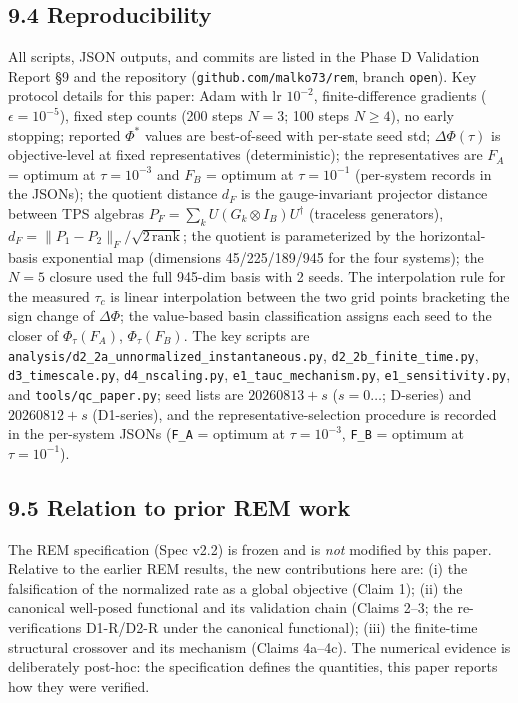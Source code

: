 \documentclass[
]{article}
\begin{document}
\subsection{9.4 Reproducibility}\label{reproducibility}

All scripts, JSON outputs, and commits are listed in the Phase D
Validation Report §9 and the repository
(\texttt{github.com/malko73/rem}, branch \texttt{open}). Key protocol
details for this paper: Adam with lr \(10^{-2}\), finite-difference
gradients (\(\epsilon = 10^{-5}\)), fixed step counts (200 steps
\(N=3\); 100 steps \(N \ge 4\)), no early stopping; reported \(\Phi^*\)
values are best-of-seed with per-state seed std; \(\Delta\Phi(\tau)\) is
objective-level at fixed representatives (deterministic); the
representatives are \(F_A\) = optimum at \(\tau=10^{-3}\) and \(F_B\) =
optimum at \(\tau=10^{-1}\) (per-system records in the JSONs); the
quotient distance \(d_F\) is the gauge-invariant projector distance
between TPS algebras \(P_F = \sum_k U(G_k \otimes I_B)U^\dagger\)
(traceless generators),
\(d_F = \|P_1 - P_2\|_F / \sqrt{2\,\mathrm{rank}}\); the quotient is
parameterized by the horizontal-basis exponential map (dimensions
45/225/189/945 for the four systems); the \(N=5\) closure used the full
945-dim basis with 2 seeds. The interpolation rule for the measured
\(\tau_c\) is linear interpolation between the two grid points
bracketing the sign change of \(\Delta\Phi\); the value-based basin
classification assigns each seed to the closer of \(\Phi_\tau(F_A)\),
\(\Phi_\tau(F_B)\). The key scripts are
\texttt{analysis/d2\_2a\_unnormalized\_instantaneous.py},
\texttt{d2\_2b\_finite\_time.py}, \texttt{d3\_timescale.py},
\texttt{d4\_nscaling.py}, \texttt{e1\_tauc\_mechanism.py},
\texttt{e1\_sensitivity.py}, and \texttt{tools/qc\_paper.py}; seed lists
are \(20260813 + s\) (\(s = 0\ldots\); D-series) and \(20260812 + s\)
(D1-series), and the representative-selection procedure is recorded in
the per-system JSONs (\texttt{F\_A} = optimum at \(\tau=10^{-3}\),
\texttt{F\_B} = optimum at \(\tau=10^{-1}\)).

\subsection{9.5 Relation to prior REM
work}\label{relation-to-prior-rem-work}

The REM specification (Spec v2.2) is frozen and is \emph{not} modified
by this paper. Relative to the earlier REM results, the new
contributions here are: (i) the falsification of the normalized rate as
a global objective (Claim 1); (ii) the canonical well-posed functional
and its validation chain (Claims 2--3; the re-verifications D1-R/D2-R
under the canonical functional); (iii) the finite-time structural
crossover and its mechanism (Claims 4a--4c). The numerical evidence is
deliberately post-hoc: the specification defines the quantities, this
paper reports how they were verified.
\end{document}
